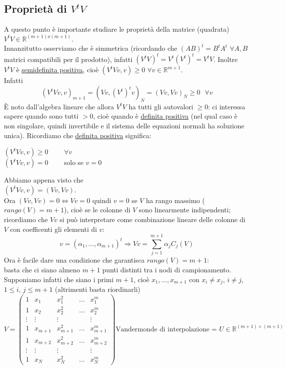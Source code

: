 \subsection{Proprietà di $V^tV$}
A questo punto è importante studiare le proprietà della matrice (quadrata) $V^tV\in\mathbb{R}^{(m+1)x(m+1)}$.\\Innanzitutto osserviamo che è simmetrica (ricordando che $(AB)^t=B^tA^t$ $\forall A,B$ matrici compatibili per il prodotto), infatti $(V^t V)^t=V^t(V^t)^t=V^tV$. Inoltre $V^tV$ è \uline{semidefinita positiva}, cioè $(V^tVv,v)\geq0$ $\forall v\in\mathbb{R}^{m+1}$.\\ Infatti
\begin{equation*}
    (V^tVv,v)_{m+1}=(Vv,(V^t)^tv)_N=(Vv,Vv)_N\geq0\  \  \  \forall v
\end{equation*}
È noto dall'algebra lineare che allora $V^tV$ ha tutti gli autovalori $\geq0$: ci interessa sapere quando sono tutti $>0$, cioè quando è \uline{definita positiva} (nel qual caso è non singolare, quindi invertibile e il sistema delle equazioni normali ha soluzione unica). Ricordiamo che \uline{definita positiva} significa:
\begin{center}
     $(V^tVv,v)\geq0$ \  \  \   \   $\forall v$   \\
     $(V^tVv,v)=0$  \  \  \  \   solo se $v=0$
\end{center}
Abbiamo appena visto che\\
$(V^tVv,v)=(Vv,Vv)$.\\Ora $(Vv,Vv)=0 \iff Vv=0$ quindi $v=0$ se $V$ ha rango massimo ($rango(V)=m+1$), cioè se le colonne di $V$ sono linearmente indipendenti; ricordiamo che $Vv$ si può interpretare come combinazione lineare delle colonne di $V$ con coefficenti gli elementi di $v$:
\begin{equation*}
    v=(\alpha_1,...,\alpha_{m+1})^t\Rightarrow Vv=\sum_{j=1}^{m+1}\alpha_jC_j(V)
\end{equation*}
Ora è facile dare una condizione che garantisca $rango(V)=m+1$:\\
basta che ci siano almeno $m+1$ punti distinti tra i nodi di campionamento.\\Supponiamo infatti che siano i primi $m+1$, cioè $x_1,...,x_{m+1}$ con $x_i\neq x_j$, $i\neq j$, $1\leq i$, $j\leq m+1$ (altrimenti basta riordinarli)
\[
    V = 
\begin{pmatrix}
1 & x_1 & x_1^2 & \dotso & x_1^m \\
1 & x_2 & x_2^2 & \dotso & x_2^m \\
\vdots & \vdots & \vdots & & \vdots \\
1 & x_{m+1} & x_{m+1}^2 & \dotso & x_{m+1}^m \\
1 & x_{m+2} & x_{m+2}^2 & \dotso & x_{m+2}^m \\
\vdots & \vdots & \vdots & & \vdots \\
1 & x_N & x_N^2 & \dotso & x_N^m
\end{pmatrix}
\text{Vandermonde di interpolazione = } U \in \mathbb{R}^{(m+1) \times (m+1)}
\]

